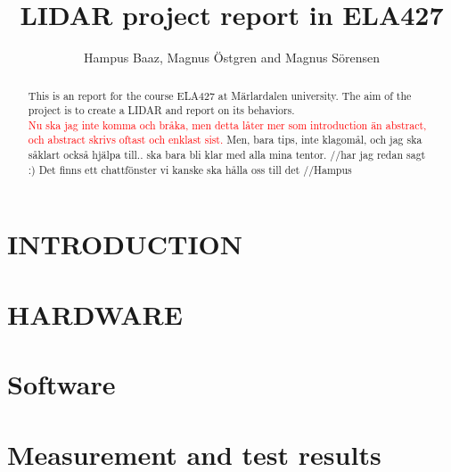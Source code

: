 

\title{\LARGE \bf
LIDAR project report in ELA427}
\author{Hampus Baaz, Magnus \"{O}stgren and Magnus S\"{o}rensen }


\maketitle
\thispagestyle{empty}
\pagestyle{empty}

\begin{abstract}
This is an report for the course ELA427 at M\"{a}rlardalen university. The aim of the project is to create a LIDAR and report on its behaviors.\\
\textcolor{red}{Nu ska jag inte komma och bråka, men detta låter mer som introduction än abstract, och abstract skrivs oftast och enklast sist.} Men, bara tips, inte klagomål, och jag ska såklart också hjälpa till.. ska bara bli klar med alla mina tentor. //har jag redan sagt :) Det finns ett chattfönster vi kanske ska hålla oss till det //Hampus
\end{abstract}


\section{INTRODUCTION}




\section{HARDWARE}\label{section:hardware}


\section{Software}\label{section:software}

\section{Measurement and test results}\label{secition:results}

\printbibliography
